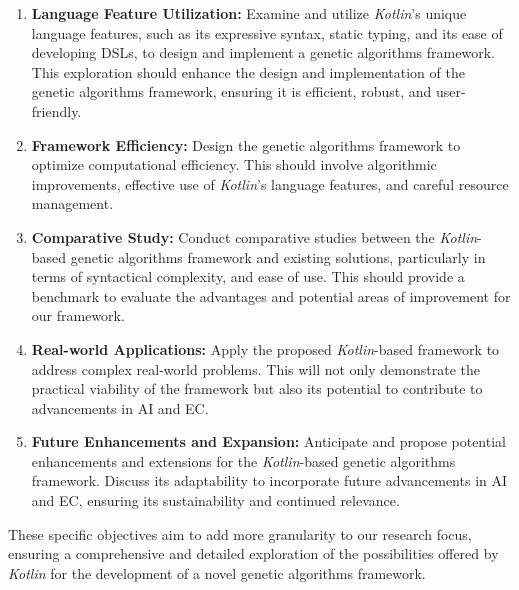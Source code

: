     \begin{enumerate}
      \item \textbf{Language Feature Utilization:} Examine and utilize 
        \textit{Kotlin}'s unique language features, such as its expressive
        syntax, static typing, and its ease of developing DSLs, to design and
        implement a genetic algorithms framework.
        This exploration should enhance the design and implementation of the 
        genetic algorithms framework, ensuring it is efficient, robust, and 
        user-friendly.
      \item \textbf{Framework Efficiency:} Design the genetic algorithms 
        framework to optimize computational efficiency.
        This should involve algorithmic improvements, effective use of 
        \textit{Kotlin}'s language features, and careful resource management.
      \item \textbf{Comparative Study:} Conduct comparative studies between the 
        \textit{Kotlin}-based genetic algorithms framework and existing 
        solutions, particularly in terms of syntactical complexity, and ease of 
        use.
        This should provide a benchmark to evaluate the advantages and potential 
        areas of improvement for our framework.
      \item \textbf{Real-world Applications:} Apply the proposed 
        \textit{Kotlin}-based framework to address complex real-world problems.
        This will not only demonstrate the practical viability of the framework 
        but also its potential to contribute to advancements in AI and EC.
      \item \textbf{Future Enhancements and Expansion:} Anticipate and propose 
        potential enhancements and extensions for the \textit{Kotlin}-based 
        genetic algorithms framework.
        Discuss its adaptability to incorporate future advancements in AI and 
        EC, ensuring its sustainability and continued relevance.
    \end{enumerate} 
    
    These specific objectives aim to add more granularity to our research focus, 
    ensuring a comprehensive and detailed exploration of the possibilities 
    offered by \textit{Kotlin} for the development of a novel genetic algorithms 
    framework.